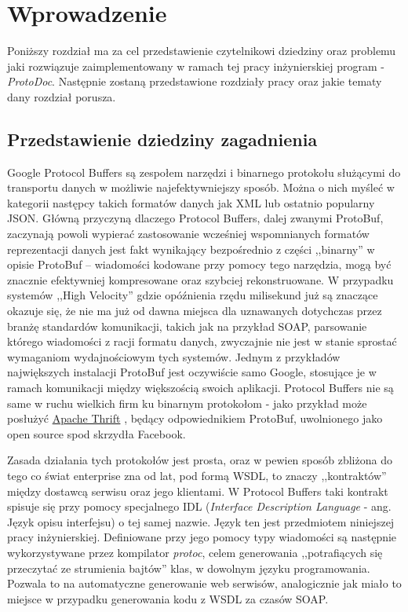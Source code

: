\documentclass[pdflatex,11pt]{aghdpl}
\author{Konrad Malawski}
\date{2012}
\begin{document}
\titlepages

\tableofcontents
\clearpage

\chapter{Wprowadzenie}
\label{cha:wprowadzenie}

Poniższy rozdział ma za cel przedstawienie czytelnikowi dziedziny oraz problemu jaki rozwiązuje zaimplementowany 
w ramach tej pracy inżynierskiej program - \textit{ProtoDoc}. Następnie zostaną przedstawione rozdziały pracy oraz jakie 
tematy dany rozdział porusza.

\section{Przedstawienie dziedziny zagadnienia}

Google Protocol Buffers są zespołem narzędzi i binarnego protokołu służącymi do transportu danych w możliwie najefektywniejszy sposób.
Można o nich myśleć w kategorii następcy takich formatów danych jak XML lub ostatnio popularny JSON. Główną przyczyną dlaczego Protocol Buffers, 
dalej zwanymi ProtoBuf, zaczynają powoli wypierać zastosowanie wcześniej wspomnianych formatów reprezentacji danych jest fakt wynikający bezpośrednio
z części ,,binarny'' w opisie ProtoBuf -- wiadomości kodowane przy pomocy tego narzędzia, mogą być znacznie efektywniej kompresowane oraz szybciej 
rekonstruowane. W przypadku systemów ,,High Velocity'' gdzie opóźnienia rzędu milisekund już są znaczące okazuje się, że nie ma już od dawna miejsca
dla uznawanych dotychczas przez branżę standardów komunikacji, takich jak na przykład SOAP, parsowanie którego wiadomości z racji formatu danych, zwyczajnie
nie jest w stanie sprostać wymaganiom wydajnościowym tych systemów. Jednym z przykładów największych instalacji ProtoBuf jest oczywiście samo Google, 
stosujące je w ramach komunikacji między większością swoich aplikacji. Protocol Buffers nie są same w ruchu wielkich firm ku binarnym protokołom - 
jako przykład może posłużyć \href{http://thrift.apache.org/}{Apache Thrift} \cite{Thrift}, będący odpowiednikiem ProtoBuf,
uwolnionego jako open source spod skrzydła Facebook. 

Zasada działania tych protokołów jest prosta, oraz w pewien sposób zbliżona do tego co świat enterprise zna od lat, pod formą WSDL, to znaczy ,,kontraktów''
między dostawcą serwisu oraz jego klientami. W Protocol Buffers taki kontrakt spisuje się przy pomocy specjalnego IDL (\textit{Interface Description Language} 
- ang. Język opisu interfejsu) o tej samej nazwie. Język ten jest przedmiotem niniejszej pracy inżynierskiej. Definiowane przy jego pomocy typy wiadomości
są następnie wykorzystywane przez kompilator \textit{protoc}, celem generowania ,,potrafiących się przeczytać ze strumienia bajtów'' klas, w dowolnym języku
programowania. Pozwala to na automatyczne generowanie web serwisów, analogicznie jak miało to miejsce w przypadku generowania kodu z WSDL za czasów SOAP.
\end{document}
